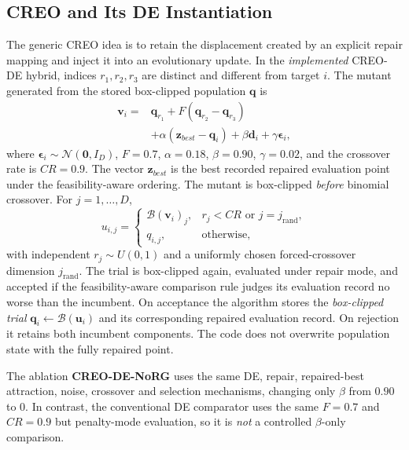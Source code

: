 \documentclass[a4paper,fleqn]{cas-sc}
\begin{document}
\subsection{CREO and Its DE Instantiation}

The generic CREO idea is to retain the displacement created by an explicit repair mapping and inject it into an evolutionary update. In the \emph{implemented} CREO-DE hybrid, indices $r_1,r_2,r_3$ are distinct and different from target $i$. The mutant generated from the stored box-clipped population $\mathbf{q}$ is
\begin{equation}
\begin{split}
\mathbf{v}_i={}&\mathbf{q}_{r_1}+F(\mathbf{q}_{r_2}-\mathbf{q}_{r_3})\\
&+\alpha(\mathbf{z}_{best}-\mathbf{q}_i)+\beta\mathbf{d}_i
+\gamma\boldsymbol{\epsilon}_i,
\end{split}
\label{eq:creode}
\end{equation}
where $\boldsymbol{\epsilon}_i\sim\mathcal{N}(\mathbf{0},I_D)$, $F=0.7$, $\alpha=0.18$, $\beta=0.90$, $\gamma=0.02$, and the crossover rate is $CR=0.9$. The vector $\mathbf{z}_{best}$ is the best recorded repaired evaluation point under the feasibility-aware ordering. The mutant is box-clipped \emph{before} binomial crossover. For $j=1,\ldots,D$,
\begin{equation}
  u_{i,j}=\begin{cases}
    \mathcal{B}(\mathbf{v}_i)_j,&r_j<CR\text{ or }j=j_{\mathrm{rand}},\\
    q_{i,j},&\text{otherwise},
  \end{cases}
\label{eq:crossover}
\end{equation}
with independent $r_j\sim U(0,1)$ and a uniformly chosen forced-crossover dimension $j_{\mathrm{rand}}$. The trial is box-clipped again, evaluated under repair mode, and accepted if the feasibility-aware comparison rule judges its evaluation record no worse than the incumbent. On acceptance the algorithm stores the \emph{box-clipped trial} $\mathbf{q}_i\leftarrow\mathcal{B}(\mathbf{u}_i)$ and its corresponding repaired evaluation record. On rejection it retains both incumbent components. The code does not overwrite population state with the fully repaired point.

The ablation \textbf{CREO-DE-NoRG} uses the same DE, repair, repaired-best attraction, noise, crossover and selection mechanisms, changing only $\beta$ from $0.90$ to $0$. In contrast, the conventional DE comparator uses the same $F=0.7$ and $CR=0.9$ but penalty-mode evaluation, so it is \emph{not} a controlled $\beta$-only comparison.
\end{document}
